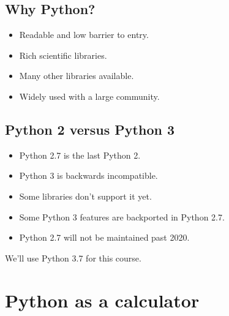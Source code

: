\documentclass[aspectratio=1610,slidestop]{beamer}
\begin{document}
\subsection{Why Python?}
\begin{pframe}
 \begin{itemize}
  \item Readable and low barrier to entry.
  \item Rich scientific libraries.
  \item Many other libraries available.
  \item Widely used with a large community.
 \end{itemize}
\end{pframe}


\subsection{Python 2 versus Python 3}
\begin{pframe}
 \begin{itemize}
  \item Python 2.7 is the last Python 2.
  \item Python 3 is backwards incompatible.
  \item Some libraries don't support it yet.
  \item Some Python 3 features are backported in Python 2.7.
  \item Python 2.7 will not be maintained past 2020.
 \end{itemize}
  We'll use Python 3.7 for this course.
\end{pframe}


\section{Python as a calculator}
\end{document}
